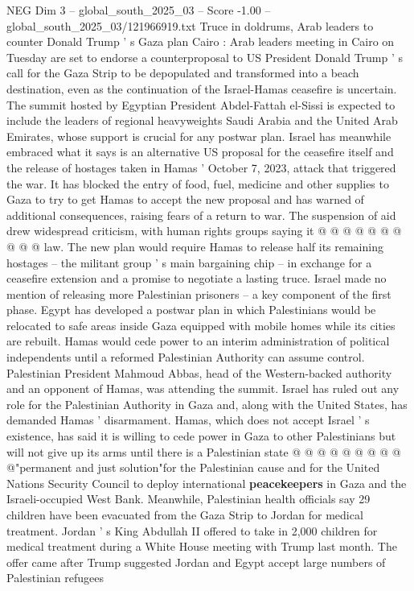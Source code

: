 \begin{textsample}{NEG Dim 3 – global\_south\_2025\_03 – Score -1.00 – global\_south\_2025\_03/121966919.txt}  \label{ex:f3_neg_419}
Truce in doldrums, Arab leaders to counter Donald Trump ' s Gaza plan Cairo : Arab leaders meeting in Cairo on Tuesday are set to endorse a counterproposal to US President Donald Trump ' s call for the Gaza Strip to be depopulated and transformed into a beach destination, even as the continuation of the Israel-Hamas ceasefire is uncertain.
The summit hosted by Egyptian President Abdel-Fattah el-Sissi is expected to include the leaders of regional heavyweights Saudi Arabia and the United Arab Emirates, whose support is crucial for any postwar plan.
Israel has meanwhile embraced what it says is an alternative US proposal for the ceasefire itself and the release of hostages taken in Hamas ' October 7, 2023, attack that triggered the war.
It has blocked the entry of food, fuel, medicine and other supplies to Gaza to try to get Hamas to accept the new proposal and has warned of additional consequences, raising fears of a return to war.
The suspension of aid drew widespread criticism, with human rights groups saying it @ @ @ @ @ @ @ @ @ @ law.
The new plan would require Hamas to release half its remaining hostages -- the militant group ' s main bargaining chip -- in exchange for a ceasefire extension and a promise to negotiate a lasting truce.
Israel made no mention of releasing more Palestinian prisoners -- a key component of the first phase.
Egypt has developed a postwar plan in which Palestinians would be relocated to safe areas inside Gaza equipped with mobile homes while its cities are rebuilt.
Hamas would cede power to an interim administration of political independents until a reformed Palestinian Authority can assume control.
Palestinian President Mahmoud Abbas, head of the Western-backed authority and an opponent of Hamas, was attending the summit.
Israel has ruled out any role for the Palestinian Authority in Gaza and, along with the United States, has demanded Hamas ' disarmament.
Hamas, which does not accept Israel ' s existence, has said it is willing to cede power in Gaza to other Palestinians but will not give up its arms until there is a Palestinian state @ @ @ @ @ @ @ @ @ @"permanent and just solution"for the Palestinian cause and for the United Nations Security Council to deploy international \textbf{peacekeepers} in Gaza and the Israeli-occupied West Bank.
Meanwhile, Palestinian health officials say 29 children have been evacuated from the Gaza Strip to Jordan for medical treatment.
Jordan ' s King Abdullah II offered to take in 2,000 children for medical treatment during a White House meeting with Trump last month.
The offer came after Trump suggested Jordan and Egypt accept large numbers of Palestinian refugees

\end{textsample}
